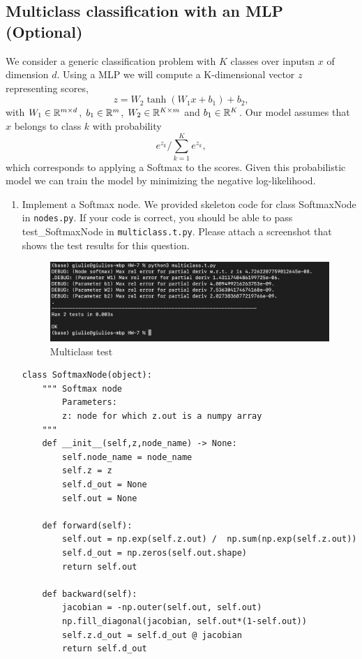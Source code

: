 \documentclass{article}
\theoremstyle{plain}
\theoremstyle{definition}
\begin{document}
\subsection{Multiclass classification with an MLP (Optional)}
We consider a generic classification problem with $K$ classes over inputsn 
$x$ of dimension $d$. Using a MLP we will compute a K-dimensional vector $z$ representing scores, 
$$
z = W_2 \tanh (W_1 x + b_1) + b_2,
$$
with $W_1 \in \mathbb{R}^{m\times d}$, $b_1 \in \mathbb{R}^m$, $W_2 \in \mathbb{R}^{K \times m}$ and $b_1 \in \mathbb{R}^K$.
Our model assumes that $x$ belongs to class $k$ with probability $$ e^{z_k}/\sum_{k=1}^K e^{z_k},$$
which corresponds to applying a Softmax to the scores. Given this probabilistic model we can train the model by minimizing the negative log-likelihood.
\begin{enumerate}
\setcounter{enumi}{\value{saveenum}}
\item Implement a Softmax node. We provided skeleton code for class SoftmaxNode in \texttt{nodes.py}. If your code is correct, you should be able to pass test\_SoftmaxNode in \texttt{multiclass.t.py}. Please attach a screenshot that shows the test results for this question.

\begin{figure}
    \centering
    \includegraphics[scale=.4]{Multiclass test.png}
    \caption{Multiclass test}
    \label{fig:Multiclass test}
\end{figure}

\subitem
\begin{verbatim}
class SoftmaxNode(object):
    """ Softmax node
        Parameters:
        z: node for which z.out is a numpy array
    """
    def __init__(self,z,node_name) -> None:
        self.node_name = node_name
        self.z = z
        self.d_out = None
        self.out = None 

    def forward(self):
        self.out = np.exp(self.z.out) /  np.sum(np.exp(self.z.out))
        self.d_out = np.zeros(self.out.shape)
        return self.out

    def backward(self):
        jacobian = -np.outer(self.out, self.out)
        np.fill_diagonal(jacobian, self.out*(1-self.out))
        self.z.d_out = self.d_out @ jacobian
        return self.d_out


\end{verbatim}
\end{enumerate}
\end{document}
